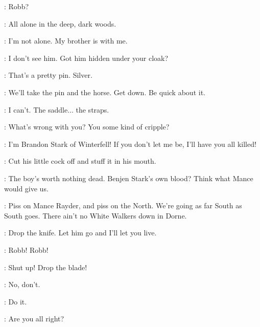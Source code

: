 \BRAN: Robb? 

\OSHA: All alone in the deep, dark woods. 

\BRAN: I'm not alone. My brother is with me. 

\WILDLINGa: I don't see him. Got him hidden under your cloak? 

\OSHA: That's a pretty pin. Silver. 

\WILDLINGa: We'll take the pin and the horse. Get down. Be quick about it. 

\BRAN: I can't. The saddle$\ldots$ the straps. 


\WILDLINGa: What's wrong with you? You some kind of cripple? 

\BRAN: I'm Brandon Stark of Winterfell! If you don't let me be, I'll have you all killed! 


\WILDLINGb: Cut his little cock off and stuff it in his mouth. 

\OSHA: The boy's worth nothing dead. Benjen Stark's own blood? Think what Mance would give us. 

\WILDLINGa: Piss on Mance Rayder, and piss on the North. We're going as far South as South goes. There ain't no White Walkers down in Dorne. 


\ROBB: Drop the knife. Let him go and I'll let you live. 


\BRAN: Robb! Robb! 

\WILDLINGa:  Shut up!  Drop the blade! 

\BRAN: No, don't. 

\WILDLINGa: Do it. 



\ROBB: Are you all right? 

